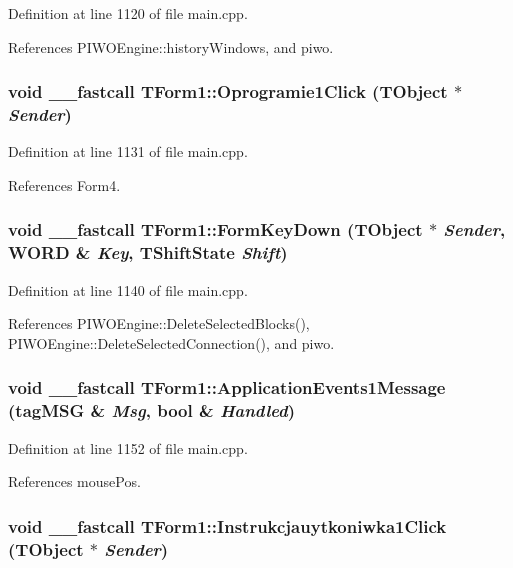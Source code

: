Definition at line 1120 of file main.cpp.

References PIWOEngine::historyWindows, and piwo.\hypertarget{classTForm1_c392ee503212147cd1ad1b424ca75552}{
\subsubsection[Oprogramie1Click]{\setlength{\rightskip}{0pt plus 5cm}void \_\-\_\-fastcall TForm1::Oprogramie1Click (TObject $\ast$ {\em Sender})}}
\label{classTForm1_c392ee503212147cd1ad1b424ca75552}




Definition at line 1131 of file main.cpp.

References Form4.\hypertarget{classTForm1_5c7d023f63fa47e531de3634725067f6}{
\subsubsection[FormKeyDown]{\setlength{\rightskip}{0pt plus 5cm}void \_\-\_\-fastcall TForm1::FormKeyDown (TObject $\ast$ {\em Sender}, \/  WORD \& {\em Key}, \/  TShiftState {\em Shift})}}
\label{classTForm1_5c7d023f63fa47e531de3634725067f6}




Definition at line 1140 of file main.cpp.

References PIWOEngine::DeleteSelectedBlocks(), PIWOEngine::DeleteSelectedConnection(), and piwo.\hypertarget{classTForm1_057ec76bdcf16cf01e63de0fe0c7eab1}{
\subsubsection[ApplicationEvents1Message]{\setlength{\rightskip}{0pt plus 5cm}void \_\-\_\-fastcall TForm1::ApplicationEvents1Message (tagMSG \& {\em Msg}, \/  bool \& {\em Handled})}}
\label{classTForm1_057ec76bdcf16cf01e63de0fe0c7eab1}




Definition at line 1152 of file main.cpp.

References mousePos.\hypertarget{classTForm1_4ad666f572df484596275292dfff633a}{
\subsubsection[Instrukcjauytkoniwka1Click]{\setlength{\rightskip}{0pt plus 5cm}void \_\-\_\-fastcall TForm1::Instrukcjauytkoniwka1Click (TObject $\ast$ {\em Sender})}}
\label{classTForm1_4ad666f572df484596275292dfff633a}




